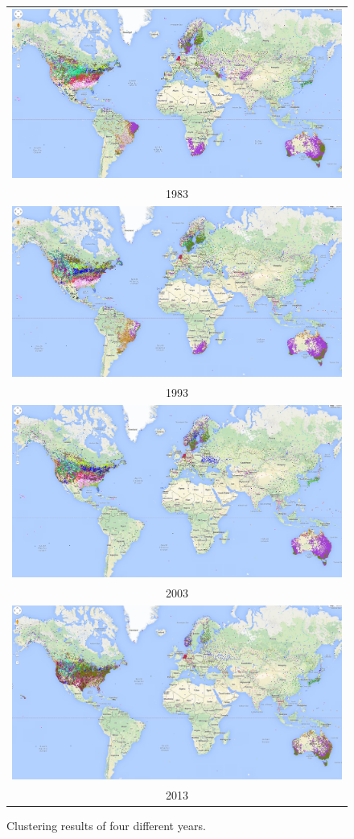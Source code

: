 \begin{figure}
    \centering
    \begin{tabular}{c}
        \includegraphics[width =.65\linewidth]{images/1983.png}\\1983\\
        \includegraphics[width =.65\linewidth]{images/1993.png}\\1993\\
        \includegraphics[width =.65\linewidth]{images/2003.png}\\2003\\
        \includegraphics[width =.65\linewidth]{images/2013.png}\\2013\\
    \end{tabular}
    \caption{Clustering results of four different years.}
\end{figure}


